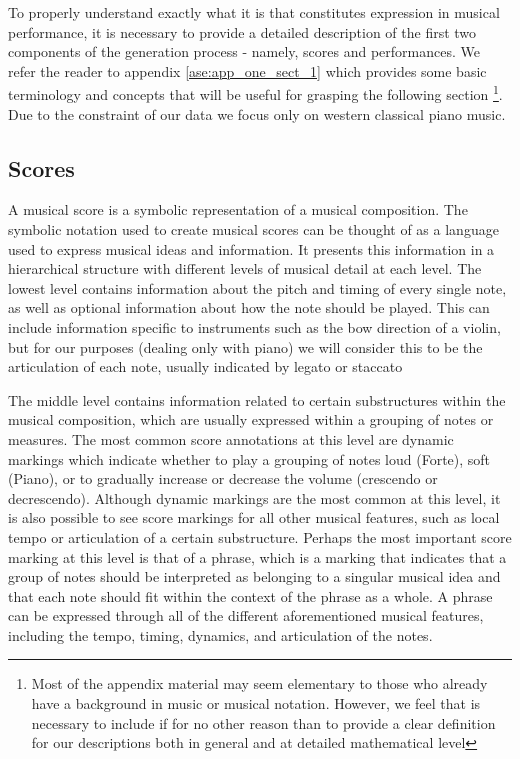 To properly understand exactly what it is that constitutes expression in musical performance, it is necessary to provide a detailed description of the first two components of the generation process - namely, scores and performances. We refer the reader to appendix \ref{ase:app_one_sect_1} which provides some basic terminology and concepts that will be useful for grasping the following section \footnote{Most of the appendix material may seem elementary to those who already have a background in music or musical notation. However, we feel that is necessary to include if for no other reason than to provide a clear definition for our descriptions both in general and at detailed mathematical level}. Due to the constraint of our data  we focus only on western classical piano music. 

\subsection{Scores}\label{sec:scores}
A musical score is a symbolic representation of a musical composition. The symbolic notation used to create musical scores can be thought of as a language used to express musical ideas and information.  It presents this information in a hierarchical structure with different levels of musical detail at each level. The lowest level contains information about the pitch and timing of every single note, as well as optional information about how the note should be played. This can include information specific to instruments such as the bow direction of a violin, but for our purposes (dealing only with piano) we will consider this to be the articulation of each note, usually indicated by legato or staccato 

The middle level contains information related to certain substructures within the musical composition, which are usually expressed within a grouping of notes or measures. The most common score annotations at this level are dynamic markings which indicate whether to play a grouping of notes loud (Forte), soft (Piano), or to gradually increase or decrease the volume (crescendo or decrescendo). %
Although dynamic markings are the most common at this level, it is also possible to see score markings for all other musical features, such as local tempo or articulation of a certain substructure. Perhaps the most important score marking at this level is that of a phrase, which is a marking that indicates that a group of notes should be interpreted as belonging to a singular musical idea and that each note should fit within the context of the phrase as a whole. A phrase can be expressed through all of the different aforementioned musical features, including the tempo, timing, dynamics, and articulation of the notes.

